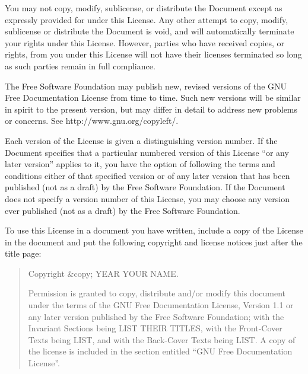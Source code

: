     
    


    

      You may not copy, modify, sublicense, or distribute the Document except as expressly
      provided for under this License. Any other attempt to copy,
      modify, sublicense or distribute the Document is void, and will
      automatically terminate your rights under this License. However,
      parties who have received copies, or rights, from you under this
      License will not have their licenses terminated so long as such
      parties remain in full compliance.
    

    
    


    

      The Free Software
      Foundation may publish new, revised versions of the GNU
      Free Documentation License from time to time. Such new versions
      will be similar in spirit to the present version, but may differ
      in detail to address new problems or concerns. See http://www.gnu.org/copyleft/.
    

    
    

      Each version of the License is given a distinguishing version
      number. If the Document
      specifies that a particular numbered version of this License
      ``or any later version'' applies to it, you have the
      option of following the terms and conditions either of that
      specified version or of any later version that has been
      published (not as a draft) by the Free Software Foundation. If
      the Document does not specify a version number of this License,
      you may choose any version ever published (not as a draft) by
      the Free Software Foundation.
    

    


    

      To use this License in a document you have written, include a copy of
      the License in the document and put the following copyright and
      license notices just after the title page:
    

    
    \begin{quote}
      

	Copyright &copy; YEAR YOUR NAME.
      

      

	Permission is granted to copy, distribute and/or modify this
	document under the terms of the GNU Free Documentation
	License, Version 1.1 or any later version published by the
	Free Software Foundation; with the Invariant Sections being LIST
	THEIR TITLES, with the Front-Cover Texts being LIST,
	and with the Back-Cover
	Texts being LIST.  A copy of the license is included in
	the section entitled ``GNU Free Documentation
	License''.
      

    \end{quote}
      
